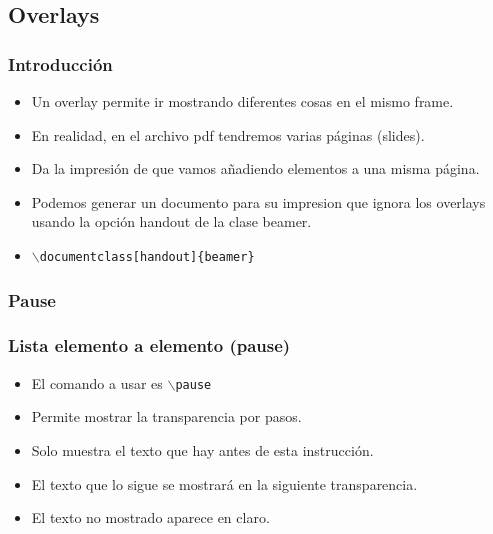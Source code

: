 \documentclass[aspectratio=1610]{beamer}%
\newcommand\rojo[1]{\textcolor[RGB]{237,41,57}{#1}}
\begin{document}
\subsection{Overlays}
\begin{frame}[fragile]
\frametitle{\textbf{Introducción}}
\justifying
 \begin{itemize}\justifying
  \item Un overlay permite ir mostrando diferentes cosas en el mismo frame.
  \item En realidad, en el archivo pdf tendremos varias páginas (slides).
  \item Da la impresión de que vamos añadiendo elementos a una misma página.
  \item Podemos generar un documento para su impresion que ignora los overlays usando la opción handout de la clase beamer.
  \item []\texttt{$\backslash$documentclass\rojo{[handout]}\{beamer\}}
\end{itemize}

\end{frame}

\subsubsection{Pause}
\begin{frame}[fragile]
\frametitle{\textbf{Lista elemento a elemento (pause)}}
\justifying
 \begin{itemize}\justifying
  \item El comando a usar es \texttt{$\backslash$pause}
  \item Permite mostrar la transparencia por pasos.
  \item Solo muestra el texto que hay antes de esta instrucción.
  \item El texto que lo sigue se mostrará en la siguiente transparencia.
  \item El texto no mostrado aparece en claro.
\end{itemize}

\end{frame}
\end{document}
